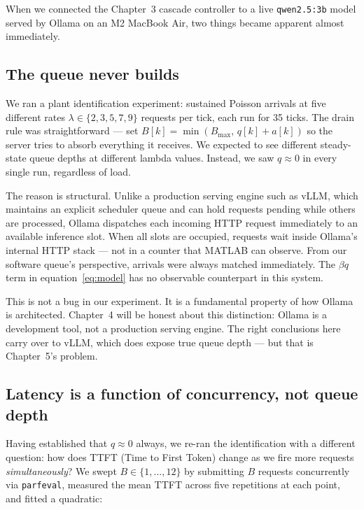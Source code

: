 \documentclass[11pt]{article}
\begin{document}
When we connected the Chapter~3 cascade controller to a live
\texttt{qwen2.5:3b} model served by Ollama on an M2 MacBook Air, two things
became apparent almost immediately.

\subsection*{The queue never builds}

We ran a plant identification experiment: sustained Poisson arrivals at
five different rates $\lambda \in \{2, 3, 5, 7, 9\}$ requests per tick,
each run for 35 ticks.  The drain rule was straightforward --- set
$B[k] = \min(B_{\max},\, q[k] + a[k])$ so the server tries to absorb
everything it receives.  We expected to see different steady-state queue
depths at different lambda values.  Instead, we saw $q \approx 0$ in every
single run, regardless of load.

The reason is structural.  Unlike a production serving engine such as vLLM,
which maintains an explicit scheduler queue and can hold requests pending
while others are processed, Ollama dispatches each incoming HTTP request
immediately to an available inference slot.  When all slots are occupied,
requests wait inside Ollama's internal HTTP stack --- not in a counter that
MATLAB can observe.  From our software queue's perspective, arrivals were
always matched immediately.  The $\beta q$ term in
equation~\eqref{eq:model} has no observable counterpart in this system.

This is not a bug in our experiment.  It is a fundamental property of how
Ollama is architected.  Chapter~4 will be honest about this distinction:
Ollama is a development tool, not a production serving engine.  The right
conclusions here carry over to vLLM, which does expose true queue depth ---
but that is Chapter~5's problem.

\subsection*{Latency is a function of concurrency, not queue depth}

Having established that $q \approx 0$ always, we re-ran the identification
with a different question: how does TTFT (Time to First Token) change as we
fire more requests \emph{simultaneously}?  We swept $B \in \{1, \ldots, 12\}$
by submitting $B$ requests concurrently via \texttt{parfeval}, measured the
mean TTFT across five repetitions at each point, and fitted a quadratic:
\end{document}
